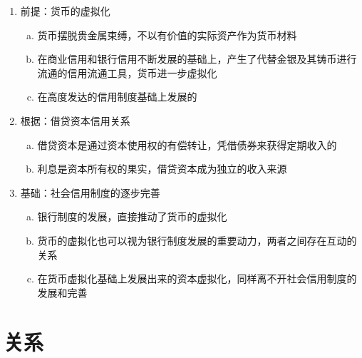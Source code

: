 \documentclass[12pt]{book}
\begin{document}
\begin{enumerate}[1.]
\begin{enumerate}[(1)]
              \item 前提：货币的虚拟化
                    \begin{enumerate}[a.]
                        \item 货币摆脱贵金属束缚，不以有价值的实际资产作为货币材料
                        \item 在商业信用和银行信用不断发展的基础上，产生了代替金银及其铸币进行流通的信用流通工具，货币进一步虚拟化
                        \item 在高度发达的信用制度基础上发展的
                    \end{enumerate}
              \item 根据：借贷资本信用关系
                    \begin{enumerate}[a.]
                        \item 借贷资本是通过资本使用权的有偿转让，凭借债券来获得定期收入的
                        \item 利息是资本所有权的果实，借贷资本成为独立的收入来源
                    \end{enumerate}
              \item 基础：社会信用制度的逐步完善
                    \begin{enumerate}[a.]
                        \item 银行制度的发展，直接推动了货币的虚拟化
                        \item 货币的虚拟化也可以视为银行制度发展的重要动力，两者之间存在互动的关系
                        \item 在货币虚拟化基础上发展出来的资本虚拟化，同样离不开社会信用制度的发展和完善
                    \end{enumerate}

          \end{enumerate}
\end{enumerate}




\section{关系}
\end{document}
